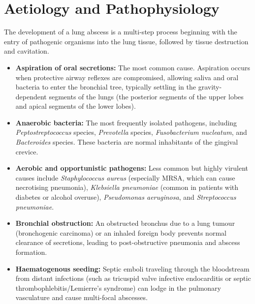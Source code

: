 \section*{Aetiology and Pathophysiology}
The development of a lung abscess is a multi-step process beginning with the entry of pathogenic organisms into the lung tissue, followed by tissue destruction and cavitation.
\begin{itemize}
    \item \textbf{Aspiration of oral secretions:} The most common cause. Aspiration occurs when protective airway reflexes are compromised, allowing saliva and oral bacteria to enter the bronchial tree, typically settling in the gravity-dependent segments of the lungs (the posterior segments of the upper lobes and apical segments of the lower lobes).
    \item \textbf{Anaerobic bacteria:} The most frequently isolated pathogens, including \textit{Peptostreptococcus} species, \textit{Prevotella} species, \textit{Fusobacterium nucleatum}, and \textit{Bacteroides} species. These bacteria are normal inhabitants of the gingival crevice.
    \item \textbf{Aerobic and opportunistic pathogens:} Less common but highly virulent causes include \textit{Staphylococcus aureus} (especially MRSA, which can cause necrotising pneumonia), \textit{Klebsiella pneumoniae} (common in patients with diabetes or alcohol overuse), \textit{Pseudomonas aeruginosa}, and \textit{Streptococcus pneumoniae}.
    \item \textbf{Bronchial obstruction:} An obstructed bronchus due to a lung tumour (bronchogenic carcinoma) or an inhaled foreign body prevents normal clearance of secretions, leading to post-obstructive pneumonia and abscess formation.
    \item \textbf{Haematogenous seeding:} Septic emboli traveling through the bloodstream from distant infections (such as tricuspid valve infective endocarditis or septic thrombophlebitis/Lemierre's syndrome) can lodge in the pulmonary vasculature and cause multi-focal abscesses.
\end{itemize}


